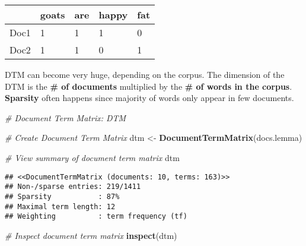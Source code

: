 \documentclass[
]{article}
\newenvironment{Shaded}{\begin{snugshade}}{\end{snugshade}}
\newcommand{\CommentTok}[1]{\textcolor[rgb]{0.56,0.35,0.01}{\textit{#1}}}
\newcommand{\KeywordTok}[1]{\textcolor[rgb]{0.13,0.29,0.53}{\textbf{#1}}}
\newcommand{\NormalTok}[1]{#1}
\newcommand{\StringTok}[1]{\textcolor[rgb]{0.31,0.60,0.02}{#1}}
\begin{document}
\begin{longtable}[]{@{}lllll@{}}
\toprule
& goats & are & happy & fat\tabularnewline
\midrule
\endhead
Doc1 & 1 & 1 & 1 & 0\tabularnewline
Doc2 & 1 & 1 & 0 & 1\tabularnewline
\bottomrule
\end{longtable}

DTM can become very huge, depending on the corpus. The dimension of the
DTM is the \textbf{\# of documents} multiplied by the \textbf{\# of
words in the corpus}. \textbf{Sparsity} often happens since majority of
words only appear in few documents.

\begin{Shaded}
\begin{Highlighting}[]
\CommentTok{# Document Term Matrix: DTM}

\CommentTok{# Create Document Term Matrix}
\NormalTok{dtm <-}\StringTok{ }\KeywordTok{DocumentTermMatrix}\NormalTok{(docs.lemma)}

\CommentTok{# View summary of document term matrix}
\NormalTok{dtm}
\end{Highlighting}
\end{Shaded}

\begin{verbatim}
## <<DocumentTermMatrix (documents: 10, terms: 163)>>
## Non-/sparse entries: 219/1411
## Sparsity           : 87%
## Maximal term length: 12
## Weighting          : term frequency (tf)
\end{verbatim}

\begin{Shaded}
\begin{Highlighting}[]
\CommentTok{# Inspect document term matrix}
\KeywordTok{inspect}\NormalTok{(dtm)}
\end{Highlighting}
\end{Shaded}
\end{document}
